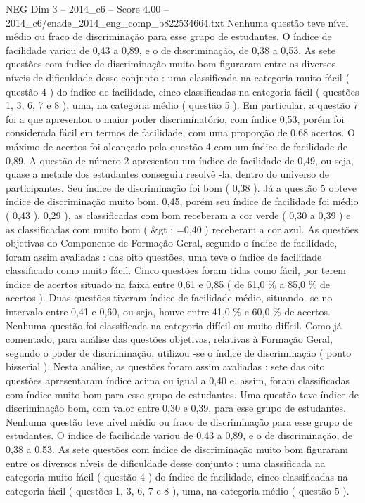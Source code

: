 \begin{textsample}{NEG Dim 3 – 2014\_c6 – Score 4.00 – 2014\_c6/enade\_2014\_eng\_comp\_b822534664.txt}
Nenhuma questão teve nível médio ou fraco de discriminação para esse grupo de estudantes.
O índice de facilidade variou de 0,43 a 0,89, e o de discriminação, de 0,38 a 0,53.
As sete questões com índice de discriminação muito bom figuraram entre os diversos níveis de dificuldade desse conjunto : uma classificada na categoria muito fácil ( questão 4 ) do índice de facilidade, cinco classificadas na categoria fácil ( questões 1, 3, 6, 7 e 8 ), uma, na categoria médio ( questão 5 ).
Em particular, a questão 7 foi a que apresentou o maior poder discriminatório, com índice 0,53, porém foi considerada fácil em termos de facilidade, com uma proporção de 0,68 acertos.
O máximo de acertos foi alcançado pela questão 4 com um índice de facilidade de 0,89.
A questão de número 2 apresentou um índice de facilidade de 0,49, ou seja, quase a metade dos estudantes conseguiu resolvê -la, dentro do universo de participantes.
Seu índice de discriminação foi bom ( 0,38 ).
Já a questão 5 obteve índice de discriminação muito bom, 0,45, porém seu índice de facilidade foi médio ( 0,43 ). 0,29 ), as classificadas com bom receberam a cor verde ( 0,30 a 0,39 ) e as classificadas com muito bom ( \&gt ; =0,40 ) receberam a cor azul.
As questões objetivas do Componente de Formação Geral, segundo o índice de facilidade, foram assim avaliadas : das oito questões, uma teve o índice de facilidade classificado como muito fácil.
Cinco questões foram tidas como fácil, por terem índice de acertos situado na faixa entre 0,61 e 0,85 ( de 61,0 \% a 85,0 \% de acertos ).
Duas questões tiveram índice de facilidade médio, situando -se no intervalo entre 0,41 e 0,60, ou seja, houve entre 41,0 \% e 60,0 \% de acertos.
Nenhuma questão foi classificada na categoria difícil ou muito difícil.
Como já comentado, para análise das questões objetivas, relativas à Formação Geral, segundo o poder de discriminação, utilizou -se o índice de discriminação ( ponto bisserial ).
Nesta análise, as questões foram assim avaliadas : sete das oito questões apresentaram índice acima ou igual a 0,40 e, assim, foram classificadas com índice muito bom para esse grupo de estudantes.
Uma questão teve índice de discriminação bom, com valor entre 0,30 e 0,39, para esse grupo de estudantes.
Nenhuma questão teve nível médio ou fraco de discriminação para esse grupo de estudantes.
O índice de facilidade variou de 0,43 a 0,89, e o de discriminação, de 0,38 a 0,53.
As sete questões com índice de discriminação muito bom figuraram entre os diversos níveis de dificuldade desse conjunto : uma classificada na categoria muito fácil ( questão 4 ) do índice de facilidade, cinco classificadas na categoria fácil ( questões 1, 3, 6, 7 e 8 ), uma, na categoria médio ( questão 5 ).

\end{textsample}
